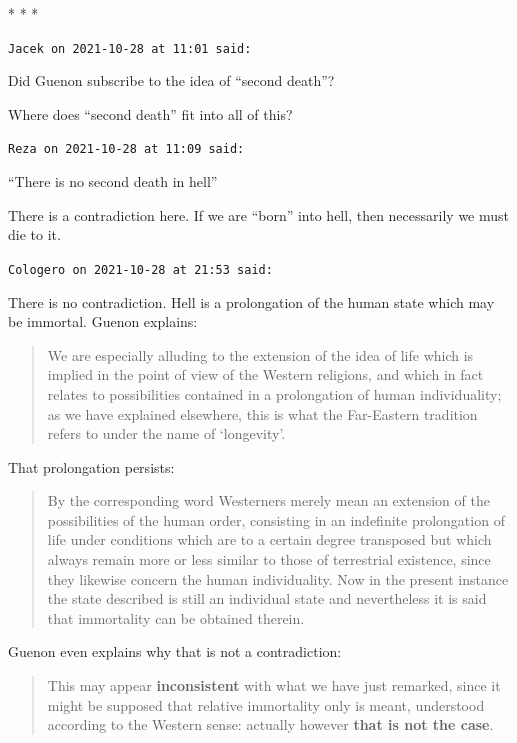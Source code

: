 
\begin{center}* * *\end{center}

\begin{footnotesize}
\begin{sffamily}
\texttt{Jacek on 2021-10-28 at 11:01 said:}

Did Guenon subscribe to the idea of ``second death''?

Where does ``second death'' fit into all of this?

\hfill

\texttt{Reza on 2021-10-28 at 11:09 said:}

``There is no second death in hell''

There is a contradiction here. If we are ``born'' into hell, then necessarily we must die to it.

\hfill

\texttt{Cologero on 2021-10-28 at 21:53 said:}

There is no contradiction. Hell is a prolongation of the human state which may be immortal. Guenon explains:

\begin{quote}\small
We are especially alluding to the extension of the idea of life which is implied in the point of view of the Western religions, and which in fact relates to possibilities contained in a prolongation of human individuality; as we have explained elsewhere, this is what the Far-Eastern tradition refers to under the name of `longevity'.
\end{quote}


That prolongation persists:

\begin{quote}\small
By the corresponding word Westerners merely mean an extension of the possibilities of the human order, consisting in an indefinite prolongation of life under conditions which are to a certain degree transposed but which always remain more or less similar to those of terrestrial existence, since they likewise concern the human individuality. Now in the present instance the state described is still an individual state and nevertheless it is said that immortality can be obtained therein.
\end{quote}


Guenon even explains why that is not a contradiction:

\begin{quote}\small
This may appear \textbf{inconsistent} with what we have just remarked, since it might be supposed that relative immortality only is meant, understood according to the Western sense: actually however \textbf{that is not the case}.
\end{quote}



\end{sffamily}
\end{footnotesize}
